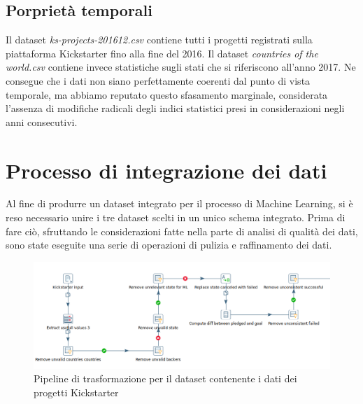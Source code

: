 \subsection{Porprietà temporali}
\label{subsec:temporali}
Il dataset \textit{ks-projects-201612.csv} contiene tutti i progetti registrati sulla piattaforma Kickstarter fino alla fine del 2016. Il dataset \textit{countries of the world.csv} contiene invece statistiche sugli stati che si riferiscono all'anno 2017. Ne consegue che i dati non siano perfettamente coerenti dal punto di vista temporale, ma abbiamo reputato questo sfasamento marginale, considerata l'assenza di modifiche radicali degli indici statistici presi in considerazioni negli anni consecutivi.

\section{Processo di integrazione dei dati}
Al fine di produrre un dataset integrato per il processo di Machine Learning, si è reso necessario unire i tre dataset scelti in un unico schema integrato. Prima di fare ciò, sfruttando le considerazioni fatte nella parte di analisi di qualità dei dati, sono state eseguite una serie di operazioni di pulizia e raffinamento dei dati.\\

\begin{figure}
	\hspace*{-1cm}%
	\includegraphics[width=\dimexpr\textwidth+2cm\relax]{images/transformation_kick}%
	\hspace*{-1cm}%
	\caption{Pipeline di trasformazione per il dataset contenente i dati dei progetti Kickstarter}
	\label{fig:transformationkick}
\end{figure}

